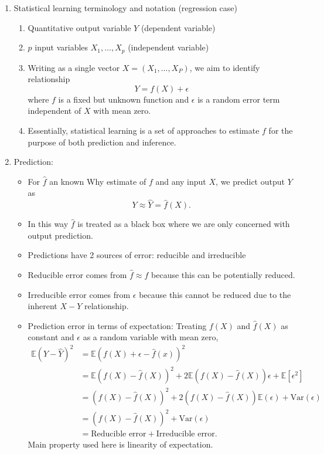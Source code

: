 \documentclass{article}
\begin{document}
\begin{enumerate}

\item Statistical learning terminology and notation (regression case)
\begin{enumerate}
\item Quantitative output variable $Y$ (dependent variable)
\item $p$ input variables $X_1, \dots, X_p$ (independent variable)
\item Writing as a single vector $X = (X_1, \dots, X_P)$, we aim to identify relationship
\[
Y = f(X) + \epsilon
\]
where $f$ is a fixed but unknown function and $\epsilon$ is a random error term independent of $X$ with mean zero.
\item Essentially, statistical learning is a set of approaches to estimate $f$ for the purpose of both prediction and inference.
\end{enumerate}

\item Prediction:
\begin{itemize}
\item For $\hat{f}$ an known Why estimate of $f$ and any input $X$, we predict output $Y$ as
\[
Y \approx \hat{Y} = \hat{f}(X).
\]
\item In this way $\hat{f}$ is treated as a black box where we are only concerned with output prediction.
\item Predictions have 2 sources of error: reducible and irreducible
\item Reducible error comes from $\hat{f} \approx f$ because this can be potentially reduced.
\item Irreducible error comes from $\epsilon$ because this cannot be reduced due to the inherent $X-Y$ relationship.
\item Prediction error in terms of expectation: Treating $f(X)$ and $\hat{f}(X)$ as constant and $\epsilon$ as a random variable with mean zero,
\begin{align*}
\mathbb{E}(Y-\hat{Y})^2 &= \mathbb{E}(f(X)+\epsilon-\hat{f}(x))^2 \\ 
&= \mathbb{E}(f(X)-\hat{f}(X))^2 +  2\mathbb{E}(f(X)-\hat{f}(X))\epsilon + \mathbb{E}[\epsilon^2]\\  
&= (f(X)-\hat{f}(X))^2 +  2(f(X)-\hat{f}(X)) \mathbb{E}(\epsilon) + \mathrm{Var}(\epsilon)\\  
&= (f(X)-\hat{f}(X))^2 + \mathrm{Var}(\epsilon)\\  
&= \text{Reducible error} + \text{Irreducible error}.
\end{align*}
Main property used here is linearity of expectation.
\end{itemize}


\end{enumerate}
\end{document}
